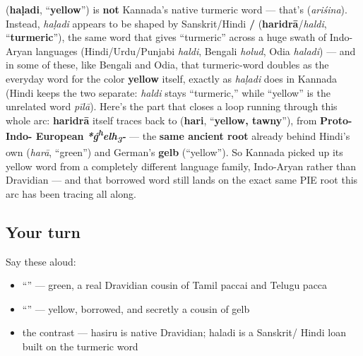\begin{cousinweb}
\textbf{} (\textbf{haḷadi}, \textquotedblleft{}\textbf{yellow}\textquotedblright{}) is \textbf{not} Kannada's native turmeric word — that's \textbf{} (\emph{ariśina}). Instead, \emph{haḷadi} appears to be shaped by Sanskrit/Hindi \textbf{/} (\textbf{haridrā}/\emph{haldi}, \textquotedblleft{}\textbf{turmeric}\textquotedblright{}), the same word that gives \textquotedblleft{}turmeric\textquotedblright{} across a huge swath of Indo-Aryan languages (Hindi/Urdu/Punjabi \emph{haldi}, Bengali \emph{holud}, Odia \emph{haladi}) — and in some of these, like Bengali and Odia, that turmeric-word doubles as the everyday word for the color \textbf{yellow} itself, exactly as \emph{haḷadi} does in Kannada (Hindi keeps the two separate: \emph{haldi} stays \textquotedblleft{}turmeric,\textquotedblright{} while \textquotedblleft{}yellow\textquotedblright{} is the unrelated word \emph{pīlā}). Here's the part that closes a loop running through this whole arc: \textbf{haridrā} itself traces back to \textbf{} (\textbf{hari}, \textquotedblleft{}\textbf{yellow, tawny}\textquotedblright{}), from \textbf{Proto-Indo- European} \emph{\textbf{*ǵ\textsuperscript{h}elh\textsubscript{3}-}} — the \textbf{same ancient root} already behind Hindi's own \textbf{} (\emph{harā}, \textquotedblleft{}green\textquotedblright{}) and German's \textbf{gelb} (\textquotedblleft{}yellow\textquotedblright{}). So Kannada picked up its yellow word from a completely different language family, Indo-Aryan rather than Dravidian — and that borrowed word still lands on the exact same PIE root this arc has been tracing all along.
\end{cousinweb}

\subsection*{Your turn}
Say these aloud:

\begin{itemize}
\raggedright
  \item \textquotedblleft{}\textquotedblright{} — green, a real Dravidian cousin of Tamil paccai and Telugu pacca
  \item \textquotedblleft{}\textquotedblright{} — yellow, borrowed, and secretly a cousin of gelb
  \item the contrast — hasiru is native Dravidian; haladi is a Sanskrit/ Hindi loan built on the turmeric word
\end{itemize}

